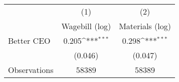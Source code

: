 {
\def\sym#1{\ifmmode^{#1}\else\(^{#1}\)\fi}
\begin{tabular}{l*{2}{c}}
\hline\hline
                    &\multicolumn{1}{c}{(1)}&\multicolumn{1}{c}{(2)}\\
                    &\multicolumn{1}{c}{Wagebill (log)}&\multicolumn{1}{c}{Materials (log)}\\
\hline
Better CEO          &       0.205\sym{***}&       0.298\sym{***}\\
                    &     (0.046)         &     (0.047)         \\
\hline
Observations        &       58389         &       58389         \\
\hline\hline
\end{tabular}
}
